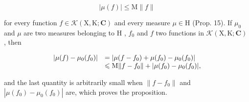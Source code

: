 \[
| \mu (f) | \leqslant \mathrm{M} \| f \|
\]

for every function \(f \in \mathcal{K}(\mathrm{X},\mathrm{K};\mathbf{C})\) and every measure \(\mu \in \mathrm{H}\) (Prop. 15). If \(\mu_0\) and \(\mu\) are two measures belonging to \(\mathrm{H}\) , \(f_0\) and \(f\) two functions in \(\mathcal{K}(\mathrm{X},\mathrm{K};\mathbf{C})\) , then

\[
\begin{array}{r l} | \mu (f) - \mu_ {0} (f _ {0}) | & = | \mu (f - f _ {0}) + \mu (f _ {0}) - \mu_ {0} (f _ {0}) | \\ & \leqslant \mathrm{M} \| f - f _ {0} \| + | \mu (f _ {0}) - \mu_ {0} (f _ {0}) |, \end{array}
\]

and the last quantity is arbitrarily small when \(\|f-f_{0}\|\) and \(|\mu(f_{0})-\mu_{0}(f_{0})|\) are, which proves the proposition.
\relax{}

